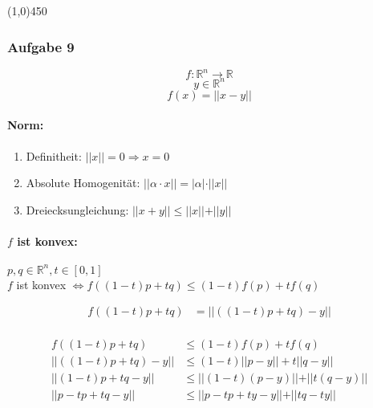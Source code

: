 \documentclass{article}
\newcommand{\hr}{\begin{center} \line(1,0){450} \end{center}}
\begin{document}
\hr
\subsubsection*{Aufgabe 9}

	$$f: \mathbb{R}^n \rightarrow \mathbb{R}$$
	$$y \in \mathbb{R}^n$$
	$$f(x) = \vert\vert x -y \vert \vert$$

	\paragraph{Norm:}
	
	\begin{enumerate}
		\item Definitheit: $\vert\vert x \vert \vert = 0 \Rightarrow x=0$
		\item Absolute Homogenität: $\vert \vert \alpha \cdot x  \vert \vert = \vert \alpha \vert \cdot \vert \vert x \vert \vert$
		\item Dreiecksungleichung: $\vert \vert x+y \vert \vert \leq \vert \vert x \vert \vert + \vert \vert y \vert \vert$
	\end{enumerate}


\paragraph{$f$ ist konvex:}
	\begin{center}
		$p,q \in \mathbb{R}^n,t \in \left[0,1 \right]$\\
		$f$ ist konvex $\Leftrightarrow f((1-t)p+tq) \leq (1-t)f(p)+ tf(q)$ 
	\end{center}
	

\begin{equation}
\begin{split}
	f((1-t)p+tq) &= \vert \vert ((1-t)p + tq) -y \vert \vert\\
	&
	\end{split}
\end{equation}


\begin{equation}
\begin{split}
	f((1-t)p+tq) &\leq (1-t)f(p) + tf(q)\\
	\vert\vert((1-t)p+tq) -y \vert\vert &\leq (1-t)\vert\vert p - y \vert\vert+ t \vert\vert q - y\vert\vert\\
	\vert\vert(1-t)p+tq -y \vert\vert &\leq \vert\vert (1 - t) (p - y) \vert\vert + \vert\vert t(q - y)\vert\vert\\
	\vert\vert p -tp + tq -y \vert\vert &\leq \vert\vert p -tp + ty -y\vert\vert + \vert\vert tq - ty\vert\vert\\
	\end{split}
\end{equation}
\end{document}

